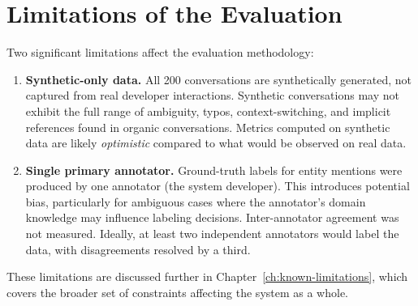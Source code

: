 \section{Limitations of the Evaluation}
\label{sec:eval-limitations}

Two significant limitations affect the evaluation methodology:

\begin{enumerate}
    \item \textbf{Synthetic-only data.}  All 200 conversations are
          synthetically generated, not captured from real developer
          interactions.  Synthetic conversations may not exhibit the full
          range of ambiguity, typos, context-switching, and implicit
          references found in organic conversations.  Metrics computed on
          synthetic data are likely \emph{optimistic} compared to what
          would be observed on real data.

    \item \textbf{Single primary annotator.}  Ground-truth labels for
          entity mentions were produced by one annotator (the system
          developer).  This introduces potential bias, particularly for
          ambiguous cases where the annotator's domain knowledge may
          influence labeling decisions.  Inter-annotator agreement was not
          measured.  Ideally, at least two independent annotators would
          label the data, with disagreements resolved by a third.
\end{enumerate}

These limitations are discussed further in
Chapter~\ref{ch:known-limitations}, which covers the broader set of
constraints affecting the system as a whole.
